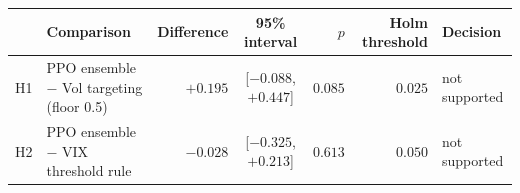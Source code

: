 \begin{tabular}{llrcrrl}
\toprule
 & Comparison & Difference & 95\% interval & $p$ & Holm threshold & Decision \\
\midrule
H1 & PPO ensemble $-$ Vol targeting (floor 0.5) & $+0.195$ & [$-0.088$, $+0.447$] & $0.085$ & $0.025$ & not supported \\
H2 & PPO ensemble $-$ VIX threshold rule & $-0.028$ & [$-0.325$, $+0.213$] & $0.613$ & $0.050$ & not supported \\
\bottomrule
\end{tabular}
